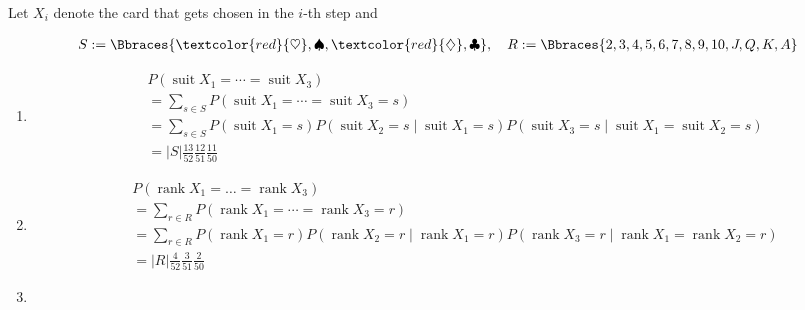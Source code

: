 \begin{solution}

Let $X_i$ denote the card that gets chosen in the $i$-th step and

\begin{align*}
    S := \Bbraces{\textcolor{red}{\heartsuit}, \spadesuit, \textcolor{red}{\diamondsuit}, \clubsuit},
    \quad
    R := \Bbraces{2, 3, 4, 5, 6, 7, 8, 9, 10, J, Q, K, A}
\end{align*}

\begin{enumerate}[label = (\alph*)]

    \item

    \begin{align*}
        &
        P(\operatorname{suit} X_1 = \cdots = \operatorname{suit} X_3) \\
        & =
        \sum_{s \in S} P(\operatorname{suit} X_1 = \cdots = \operatorname{suit} X_3 = s) \\
        & =
        \sum_{s \in S} P(\operatorname{suit} X_1 = s) P(\operatorname{suit} X_2 = s \mid \operatorname{suit} X_1 = s) P(\operatorname{suit} X_3 = s \mid \operatorname{suit} X_1 = \operatorname{suit} X_2 = s) \\
        & =
        |S| \frac{13}{52} \frac{12}{51} \frac{11}{50}
    \end{align*}

    \item

    \begin{align*}
        &
        P(\operatorname{rank} X_1 = \dots = \operatorname{rank} X_3) \\
        & =
        \sum_{r \in R} P(\operatorname{rank} X_1 = \cdots = \operatorname{rank} X_3 = r) \\
        & =
        \sum_{r \in R} P(\operatorname{rank} X_1 = r) P(\operatorname{rank} X_2 = r \mid \operatorname{rank} X_1 = r) P(\operatorname{rank} X_3 = r \mid \operatorname{rank} X_1 = \operatorname{rank} X_2 = r) \\
        & =
        |R| \frac{4}{52} \frac{3}{51} \frac{2}{50}
    \end{align*}

    \item


\end{enumerate}
\end{solution}
